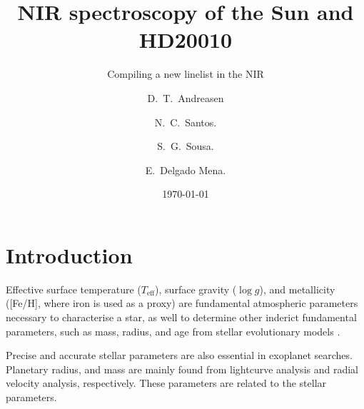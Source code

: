 \documentclass{aa}
\begin{document}
\title{NIR spectroscopy of the Sun and HD20010}
\subtitle{Compiling a new linelist in the NIR}

\subtitle{}

\author{D.~T.~Andreasen
    \and N.~C.~Santos.
    \and S.~G.~Sousa.
    \and E.~Delgado Mena.}









\date{\today}

\abstract{}{}{}{}



\maketitle



\section{Introduction}
\label{sec:introduction}
Effective surface temperature ($T_\mathrm{eff}$), surface gravity ($\log g$),
and metallicity ([Fe/H], where iron is used as a proxy) are fundamental
atmospheric parameters necessary to characterise a star, as well to determine
other inderict fundamental parameters, such as mass, radius, and age from
stellar evolutionary models \citep{Girardi2000}.

Precise and accurate stellar parameters are also essential in exoplanet
searches. Planetary radius, and mass are mainly found from lightcurve analysis and
radial velocity analysis, respectively. These parameters are related to the
stellar parameters.




%
\end{document}
